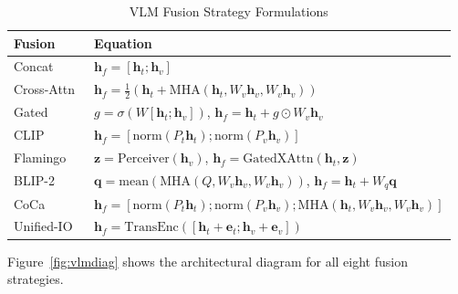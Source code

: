 \documentclass[12pt, a4paper, oneside]{Thesis}
\begin{document}
\begin{table}[t]
\caption{VLM Fusion Strategy Formulations}
\label{tab:vlmfusions}
\centering\footnotesize
\begin{tabular}{p{1.2cm}p{6.1cm}}
\toprule
\textbf{Fusion} & \textbf{Equation}\\
\midrule
Concat      & $\mathbf{h}_f = [\mathbf{h}_t;\mathbf{h}_v]$\\[2pt]
Cross-Attn~\cite{Vaswani2017}  & $\mathbf{h}_f = \frac{1}{2}(\mathbf{h}_t+\mathrm{MHA}(\mathbf{h}_t,W_v\mathbf{h}_v,W_v\mathbf{h}_v))$\\[2pt]
Gated       & $g=\sigma(W[\mathbf{h}_t;\mathbf{h}_v])$,\; $\mathbf{h}_f = \mathbf{h}_t + g\odot W_v\mathbf{h}_v$\\[2pt]
CLIP~\cite{Radford2021}        & $\mathbf{h}_f = [\mathrm{norm}(P_t\mathbf{h}_t);\mathrm{norm}(P_v\mathbf{h}_v)]$\\[2pt]
Flamingo~\cite{Alayrac2022}    & $\mathbf{z}=\mathrm{Perceiver}(\mathbf{h}_v)$,\;
              $\mathbf{h}_f=\mathrm{GatedXAttn}(\mathbf{h}_t,\mathbf{z})$\\[2pt]
BLIP-2~\cite{Li2023}           & $\mathbf{q}=\mathrm{mean}(\mathrm{MHA}(Q,W_v\mathbf{h}_v,W_v\mathbf{h}_v))$,\;
              $\mathbf{h}_f=\mathbf{h}_t+W_q\mathbf{q}$\\[2pt]
CoCa~\cite{Yu2022}             & $\mathbf{h}_f = [\mathrm{norm}(P_t\mathbf{h}_t);\mathrm{norm}(P_v\mathbf{h}_v);\mathrm{MHA}(\mathbf{h}_t,W_v\mathbf{h}_v,W_v\mathbf{h}_v)]$\\[2pt]
Unified-IO~\cite{Lu2022}  & $\mathbf{h}_f = \mathrm{TransEnc}([\mathbf{h}_t{+}\mathbf{e}_t;\mathbf{h}_v{+}\mathbf{e}_v])$\\
\bottomrule
\end{tabular}
\end{table}

Figure~\ref{fig:vlmdiag} shows the architectural diagram for all eight fusion strategies.
\end{document}
